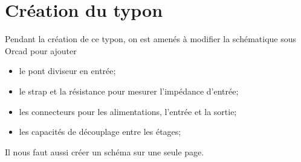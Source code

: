 \chapter{Création du typon}
Pendant la création de ce typon, on est amenés à modifier la schématique sous Orcad pour ajouter
\begin{itemize}
    \item le pont diviseur en entrée;
    \item le strap et la résistance pour mesurer l’impédance d’entrée;
    \item les connecteurs pour les alimentations, l’entrée et la sortie;
    \item les capacités de découplage entre les étages;
\end{itemize}

Il nous faut aussi créer un schéma sur une seule page.
